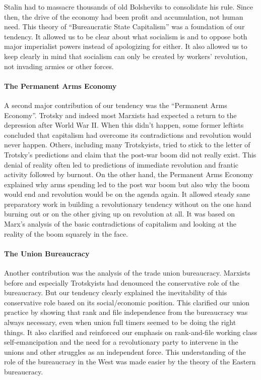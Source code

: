Stalin had to massacre thousands of old Bolsheviks to consolidate his rule. Since then, the drive of the economy had been profit and accumulation, not human need. This theory of ``Bureaucratic State Capitalism'' was a foundation of our tendency. It allowed us to be clear about what socialism is and to oppose both major imperialist powers instead of apologizing for either. It also allowed us to keep clearly in mind that socialism can only be created by workers' revolution, not invading armies or other forces.

\paragraph{The Permanent Arms Economy}

A second major contribution of our tendency was the ``Permanent Arms Economy''. Trotsky and indeed most Marxists had expected a return to the depression after World War II. When this didn't happen, some former leftists concluded that capitalism had overcome its contradictions and revolution would never happen. Others, including many Trotskyists, tried to stick to the letter of Trotsky's predictions and claim that the post-war boom did not really exist. This denial of reality often led to predictions of immediate revolution and frantic activity followed by burnout. On the other hand, the Permanent Arms Economy explained why arms spending led to the post war boom but also why the boom would end and revolution would be on the agenda again. It allowed steady sane preparatory work in building a revolutionary tendency without on the one hand burning out or on the other giving up on revolution at all. It was based on Marx's analysis of the basic contradictions of capitalism and looking at the reality of the boom squarely in the face.

\paragraph{The Union Bureaucracy}

Another contribution was the analysis of the trade union bureaucracy. Marxists before and especially Trotskyists had denounced the conservative role of the bureaucracy. But our tendency clearly explained the inevitability of this conservative role based on its social/economic position. This clarified our union practice by showing that rank and file independence from the bureaucracy was always necessary, even when union full timers seemed to be doing the right things. It also clarified and reinforced our emphasis on rank-and-file working class self-emancipation and the need for a revolutionary party to intervene in the unions and other struggles as an independent force. This understanding of the role of the bureaucracy in the West was made easier by the theory of the Eastern bureaucracy.

